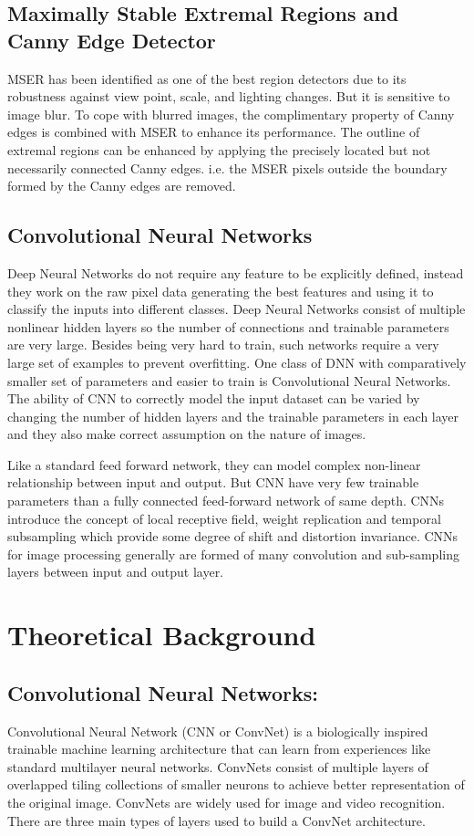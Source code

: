     \subsection{Maximally Stable Extremal Regions and Canny Edge Detector}
    
MSER has been identified as one of the best region detectors due to its robustness against view point, scale, and lighting changes. But it is sensitive to image blur. To cope with blurred images, the complimentary property of Canny edges is combined with MSER to enhance its performance. The outline of extremal regions can be enhanced by applying the precisely located but not necessarily connected Canny edges. i.e. the MSER pixels outside the boundary formed by the Canny edges are removed.

    \subsection{Convolutional Neural Networks}
Deep Neural Networks do not require any feature to be explicitly defined, instead they work on the raw pixel data generating the best features and using it to classify the inputs into different classes. Deep Neural Networks consist of multiple nonlinear hidden layers so the number of connections and trainable parameters are very large. Besides being very hard to train, such networks require a very large set of examples to prevent overfitting. One class of DNN with comparatively smaller set of parameters and easier to train is Convolutional Neural Networks. The ability of CNN to correctly model the input dataset can be varied by changing the number of hidden layers and the trainable parameters in each layer and they also make correct assumption on the nature of images. 

Like a standard feed forward network, they can model complex non-linear relationship between input and output. But CNN have very few trainable parameters than a fully connected feed-forward network of same depth. CNNs introduce the concept of local receptive field, weight replication and temporal subsampling which provide some degree of shift and distortion invariance. CNNs for image processing generally are formed of many convolution and sub-sampling layers between input and output layer.


\section{Theoretical Background}
    \subsection{Convolutional Neural Networks:}
Convolutional Neural Network (CNN or ConvNet) is a biologically inspired trainable machine learning architecture that can learn from experiences like standard multilayer neural networks. ConvNets consist of multiple layers of overlapped tiling collections of smaller neurons to achieve better representation of the original image. ConvNets are widely used for image and video recognition. There are three main types of layers used to build a ConvNet architecture.

